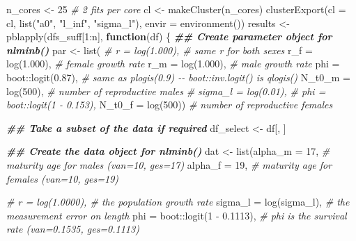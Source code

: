 \documentclass[
]{article}
\newenvironment{Shaded}{\begin{snugshade}}{\end{snugshade}}
\newcommand{\AttributeTok}[1]{\textcolor[rgb]{0.77,0.63,0.00}{#1}}
\newcommand{\CommentTok}[1]{\textcolor[rgb]{0.56,0.35,0.01}{\textit{#1}}}
\newcommand{\ControlFlowTok}[1]{\textcolor[rgb]{0.13,0.29,0.53}{\textbf{#1}}}
\newcommand{\DecValTok}[1]{\textcolor[rgb]{0.00,0.00,0.81}{#1}}
\newcommand{\DocumentationTok}[1]{\textcolor[rgb]{0.56,0.35,0.01}{\textbf{\textit{#1}}}}
\newcommand{\FloatTok}[1]{\textcolor[rgb]{0.00,0.00,0.81}{#1}}
\newcommand{\FunctionTok}[1]{\textcolor[rgb]{0.00,0.00,0.00}{#1}}
\newcommand{\NormalTok}[1]{#1}
\newcommand{\OtherTok}[1]{\textcolor[rgb]{0.56,0.35,0.01}{#1}}
\newcommand{\SpecialCharTok}[1]{\textcolor[rgb]{0.00,0.00,0.00}{#1}}
\newcommand{\StringTok}[1]{\textcolor[rgb]{0.31,0.60,0.02}{#1}}
\begin{document}
\begin{Shaded}
\begin{Highlighting}[]
\NormalTok{n\_cores }\OtherTok{\textless{}{-}} \DecValTok{25} \CommentTok{\# 2 fits per core}
\NormalTok{cl }\OtherTok{\textless{}{-}} \FunctionTok{makeCluster}\NormalTok{(n\_cores)}
\FunctionTok{clusterExport}\NormalTok{(}\AttributeTok{cl =}\NormalTok{ cl, }\FunctionTok{list}\NormalTok{(}\StringTok{"a0"}\NormalTok{, }\StringTok{"l\_inf"}\NormalTok{, }\StringTok{"sigma\_l"}\NormalTok{), }\AttributeTok{envir =} \FunctionTok{environment}\NormalTok{())}
\NormalTok{results }\OtherTok{\textless{}{-}} \FunctionTok{pblapply}\NormalTok{(dfs\_suff[}\DecValTok{1}\SpecialCharTok{:}\NormalTok{n], }\ControlFlowTok{function}\NormalTok{(df) \{}
  \DocumentationTok{\#\# Create parameter object for nlminb()}
\NormalTok{  par }\OtherTok{\textless{}{-}} \FunctionTok{list}\NormalTok{(}
    \CommentTok{\# r = log(1.000),                             \# same r for both sexes}
    \AttributeTok{r\_f =} \FunctionTok{log}\NormalTok{(}\FloatTok{1.000}\NormalTok{),                             }\CommentTok{\# female growth rate}
    \AttributeTok{r\_m =} \FunctionTok{log}\NormalTok{(}\FloatTok{1.000}\NormalTok{),                             }\CommentTok{\# male growth rate}
    \AttributeTok{phi =}\NormalTok{ boot}\SpecialCharTok{::}\FunctionTok{logit}\NormalTok{(}\FloatTok{0.87}\NormalTok{), }\CommentTok{\# same as plogis(0.9) {-}{-} boot::inv.logit() is qlogis()}
    \AttributeTok{N\_t0\_m =} \FunctionTok{log}\NormalTok{(}\DecValTok{500}\NormalTok{),                            }\CommentTok{\# number of reproductive males}
    \CommentTok{\# sigma\_l = log(0.01),}
    \CommentTok{\# phi = boot::logit(1 {-} 0.153),}
    \AttributeTok{N\_t0\_f =} \FunctionTok{log}\NormalTok{(}\DecValTok{500}\NormalTok{))                            }\CommentTok{\# number of reproductive females}
  
  \DocumentationTok{\#\# Take a subset of the data if required}
\NormalTok{  df\_select }\OtherTok{\textless{}{-}}\NormalTok{ df[, ]}
  
  \DocumentationTok{\#\# Create the data object for nlminb()}
\NormalTok{  dat }\OtherTok{\textless{}{-}} \FunctionTok{list}\NormalTok{(}\AttributeTok{alpha\_m =} \DecValTok{17}\NormalTok{,                         }\CommentTok{\# maturity age for males (van=10, ges=17)}
              \AttributeTok{alpha\_f =} \DecValTok{19}\NormalTok{,                         }\CommentTok{\# maturity age for females (van=10, ges=19)}
              
              \CommentTok{\# r = log(1.0000),                    \# the population growth rate}
              \AttributeTok{sigma\_l =} \FunctionTok{log}\NormalTok{(sigma\_l),               }\CommentTok{\# the measurement error on length}
              \AttributeTok{phi =}\NormalTok{ boot}\SpecialCharTok{::}\FunctionTok{logit}\NormalTok{(}\DecValTok{1} \SpecialCharTok{{-}} \FloatTok{0.1113}\NormalTok{),        }\CommentTok{\# phi is the survival rate (van=0.1535, ges=0.1113)}
              

\end{Highlighting}
\end{Shaded}
\end{document}
